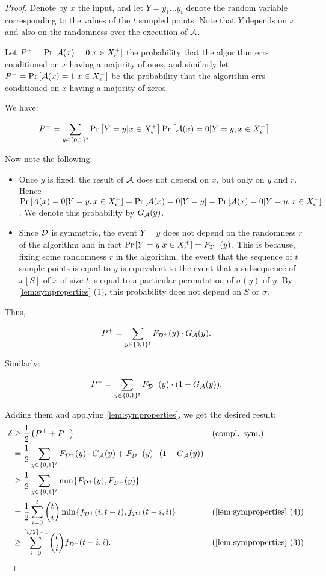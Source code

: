 \begin{proof}
Denote by $x$ the input, and let $Y = y_1 \ldots y_t$ denote the random variable corresponding
to the values of the $t$ sampled points. Note that $Y$ depends on $x$ and also on the randomness
over the execution of $\mathcal{A}$. 

Let $P^+ = \text{Pr}\left[\mathcal{A}(x) = 0 | x \in X^+_\epsilon\right]$ the probability that the algorithm errs
conditioned on $x$ having a majority of ones, and similarly let 
$P^- = \text{Pr}\left[\mathcal{A}(x) = 1 | x \in X^-_\epsilon\right]$ be the probability that the algorithm errs conditioned
on $x$ having a majority of zeros.

We have:

$$
P^+ = \sum_{y\in \{0, 1\}^t} \text{Pr}\left[Y = y | x \in X^+_\epsilon\right] \text{Pr}\left[\mathcal{A}(x) = 0 | Y = y, x \in X^+_\epsilon\right].
$$

Now note the following:

\begin{itemize}
    \item Once $y$ is fixed, the result of $\mathcal{A}$ does not depend on $x$, but only on $y$ and $r$.
    Hence $\text{Pr}\left[A(x) = 0 | Y = y, x \in X^+_\epsilon\right] = \text{Pr}\left[\mathcal{A}(x) = 0 | Y = y\right] = \text{Pr}\left[\mathcal{A}(x) = 0 | Y = y, x \in X^-_\epsilon\right]$.
    We denote this probability by $G_{\mathcal{A}}(y)$.
    \item Since $\mathcal{D}$ is symmetric, the event $Y = y$ does not depend on the
    randomness $r$ of the algorithm and in fact $\text{Pr}\left[Y = y | x \in X^+_\epsilon\right] = F_{\mathcal{D}^+}(y)$.
    This is because, fixing some randomness $r$ in the algorithm, the event that the sequence
    of $t$ sample points is equal to $y$ is equivalent to the event that a subsequence of
    $x[S]$ of $x$ of size $t$ is equal to a particular permutation of $\sigma(y)$ of $y$. 
    By \cref{lem:symproperties} (1), this probability does not depend on $S$ or $\sigma$.
\end{itemize}

Thus, 

$$
P^+ = \sum_{y \in \{0, 1\}^t} F_{\mathcal{D}^+}(y) \cdot G_{\mathcal{A}}(y).
$$

Similarly:

$$
P^- = \sum_{y \in \{0, 1\}^t} F_{\mathcal{D}^-}(y) \cdot (1-G_{\mathcal{A}}(y)).
$$

Adding them and applying \cref{lem:symproperties}, we get the desired result:
\begin{align*}
\delta & \geq \frac{1}{2}\left(P^+ + P^-\right) && (\text{compl. sym.}) \\
        & = \frac{1}{2}\sum_{y \in \{0, 1\}^t} F_{\D^+}(y) \cdot G_\A(y) + F_{\D^-}(y) \cdot (1-G_\A(y)) \\ 
        & \geq \frac{1}{2}\sum_{y \in \{0, 1\}^t} \min \{F_{\D^+}(y), F_{\D^-}(y)\} \\
        & = \frac{1}{2}\sum_{i=0}^{t} \binom{t}{i} \min \{f_{\D^+}(i, t-i), f_{\D^+}(t-i, i)\} 
        && (\text{\cref{lem:symproperties} (4)})\\
        & \geq \sum_{i=0}^{\lceil t/2 \rceil-1} \binom{t}{i} f_{\D^+}(t-i, i).
        && (\text{\cref{lem:symproperties} (3)})
\end{align*}

\end{proof}


